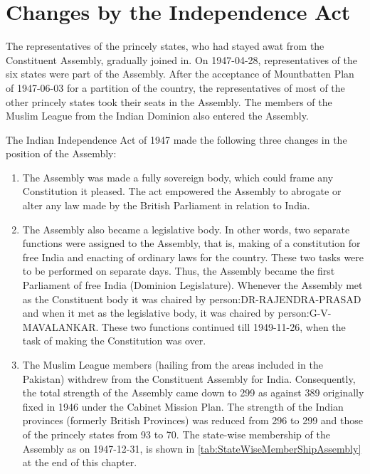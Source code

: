 \section{Changes by the Independence Act}

The representatives of the princely states, who had stayed awat from the Constituent Assembly, gradually joined in. On 1947-04-28, representatives of the six states were part of the Assembly. After the acceptance of Mountbatten Plan of 1947-06-03 for a partition of the country, the representatives of most of the other princely states took their seats in the Assembly. The members of the Muslim League from the Indian Dominion also entered the Assembly.

The Indian Independence Act of 1947 made the following three changes in the position of the Assembly:

\begin{enumerate}
  \item The Assembly was made a fully sovereign body, which could frame any Constitution it pleased. The act empowered the Assembly to abrogate or alter any law made by the British Parliament in relation to India.
  \item The Assembly also became a legislative body. In other words, two separate functions were assigned to the Assembly, that is, making of a constitution for free India and enacting of ordinary laws for the country. These two tasks were to be performed on separate days. Thus, the Assembly became the first Parliament of free India (Dominion Legislature). Whenever the Assembly met as the Constituent body it was chaired by \gls{person:DR-RAJENDRA-PRASAD} and when it met as the legislative body, it was chaired by \gls{person:G-V-MAVALANKAR}. These two functions continued till 1949-11-26, when the task of making the Constitution was over.
  \item The Muslim League members (hailing from the areas included in the Pakistan) withdrew from the Constituent Assembly for India. Consequently, the total strength of the Assembly came down to 299 as against 389 originally fixed in 1946 under the Cabinet Mission Plan. The strength of the Indian provinces (formerly British Provinces) was reduced from 296 to 299 and those of the princely states from 93 to 70. The state-wise membership of the Assembly as on 1947-12-31, is shown in \ref{tab:StateWiseMemberShipAssembly} at the end of this chapter.
\end{enumerate}

